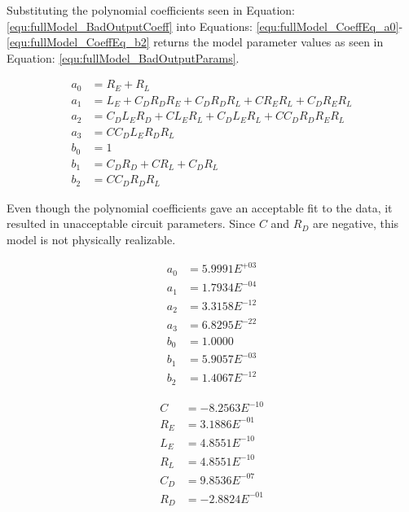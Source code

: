 

Substituting the polynomial coefficients seen in Equation: \eqref{equ:fullModel_BadOutputCoeff} into Equations: \eqref{equ:fullModel_CoeffEq_a0}-\eqref{equ:fullModel_CoeffEq_b2} returns the model parameter values as seen in Equation: \eqref{equ:fullModel_BadOutputParams}.

\begin{align}
     a_0 &= R_E + R_L                                         \label{equ:fullModel_CoeffEq_a0} \\
     a_1 &= L_E + C_DR_DR_E + C_DR_DR_L + CR_ER_L + C_DR_ER_L \label{equ:fullModel_CoeffEq_a1} \\
     a_2 &= C_DL_ER_D + CL_ER_L + C_DL_ER_L + CC_DR_DR_ER_L   \label{equ:fullModel_CoeffEq_a2} \\
     a_3 &= CC_DL_ER_DR_L                                     \label{equ:fullModel_CoeffEq_a3} \\
     b_0 &= 1                                                 \label{equ:fullModel_CoeffEq_b0} \\
     b_1 &= C_DR_D + CR_L + C_DR_L                            \label{equ:fullModel_CoeffEq_b1} \\
     b_2 &= CC_DR_DR_L                                        \label{equ:fullModel_CoeffEq_b2}
\end{align}

Even though the polynomial coefficients gave an acceptable fit to the data, it resulted in unacceptable circuit parameters. Since $C$ and $R_D$ are negative, this model is not physically realizable.

\begin{multicols}{2}
    \begin{equation}
        \label{equ:fullModel_BadOutputCoeff}
        \begin{split}
             a_0 &= 5.9991E^{+03} \\
             a_1 &= 1.7934E^{-04} \\
             a_2 &= 3.3158E^{-12} \\
             a_3 &= 6.8295E^{-22} \\
             b_0 &= 1.0000        \\
             b_1 &= 5.9057E^{-03} \\
             b_2 &= 1.4067E^{-12}
        \end{split}
    \end{equation}

    \begin{equation}
        \label{equ:fullModel_BadOutputParams}
        \begin{split}
            C &= -8.2563E^{-10} \\
            R_E &=  3.1886E^{-01} \\
            L_E &=  4.8551E^{-10} \\
            R_L &=  4.8551E^{-10} \\
            C_D &=  9.8536E^{-07} \\
            R_D &= -2.8824E^{-01}
        \end{split}
    \end{equation}
\end{multicols}

